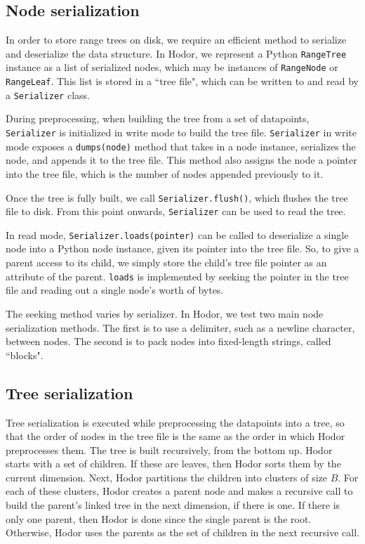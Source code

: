 \documentclass[11pt, oneside]{article}
\begin{document}
\subsection{Node serialization}

In order to store range trees on disk, we require an efficient method to
serialize and deserialize the data structure. In Hodor, we represent a Python
\texttt{RangeTree} instance as a list of serialized nodes, which may be
instances of \texttt{RangeNode} or \texttt{RangeLeaf}. This list is stored in a
``tree file", which can be written to and read by a \texttt{Serializer} class. 

During preprocessing, when building the tree from a set of datapoints,
\texttt{Serializer} is initialized in write mode to build the tree file.
\texttt{Serializer} in write mode exposes a \texttt{dumps(node)} method that
takes in a node instance, serializes the node, and appends it to the tree file.
This method also assigns the node a pointer into the tree file, which
is the number of nodes appended previously to it. 

Once the tree is fully built, we call \texttt{Serializer.flush()}, which
flushes the tree file to disk. From this point onwards, \texttt{Serializer} can
be used to read the tree.

In read mode, \texttt{Serializer.loads(pointer)} can be called to deserialize a
single node into a Python node instance, given its pointer into the tree file.
So, to give a parent access to its child, we simply store the child's tree file
pointer as an attribute of the parent. \texttt{loads} is implemented by seeking
the pointer in the tree file and reading out a single node's worth of bytes.

The seeking method varies by serializer. In Hodor, we test two main node
serialization methods. The first is to use a delimiter, such as a newline
character, between nodes. The second is to pack nodes into fixed-length
strings, called ``blocks". 

\subsection{Tree serialization}


Tree serialization is executed while preprocessing the datapoints into a tree,
so that the order of nodes in the tree file is the same as the order in which
Hodor preprocesses them. The tree is built recursively, from the bottom up.
Hodor starts with a set of children. If these are leaves, then Hodor sorts them
by the current dimension. Next, Hodor partitions the children into clusters of
size $B$. For each of these clusters, Hodor creates a parent node and makes a
recursive call to build the parent's linked tree in the next dimension, if
there is one. If there is only one parent, then Hodor is done since the single
parent is the root.  Otherwise, Hodor uses the parents as the set of children
in the next recursive call. 
\end{document}
